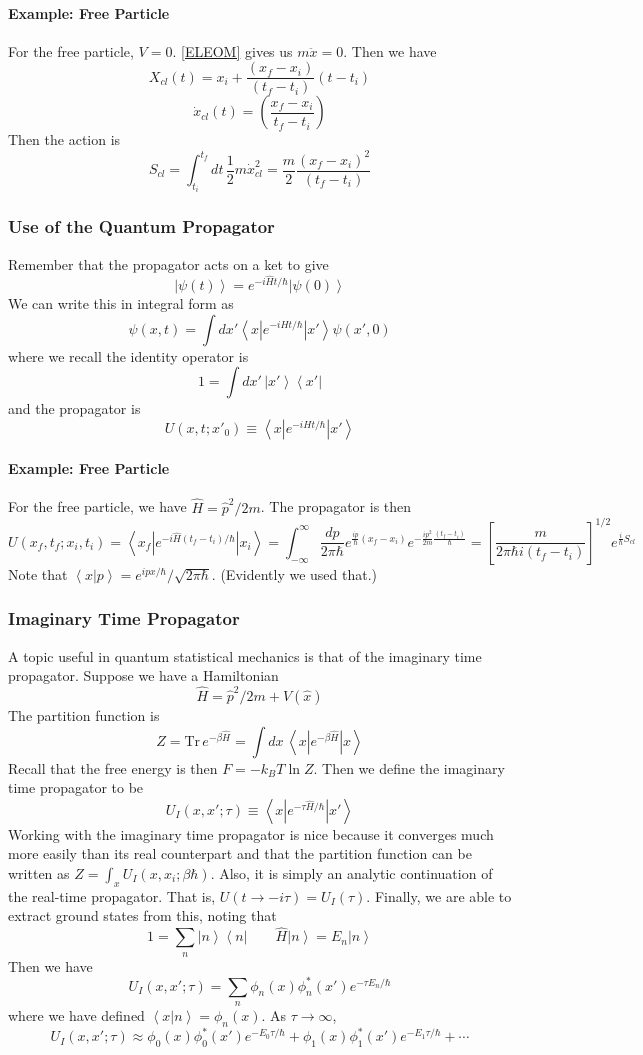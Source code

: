 \documentclass{article}
\begin{document}
	\paragraph{Example: Free Particle} For the free particle, $V=0$. \eqref{ELEOM} gives us $m\ddot{x}=0$. Then we have
	$$X_{cl}(t)=x_i+\frac{(x_f-x_i)}{(t_f-t_i)}(t-t_i)$$
	$$\dot{x}_{cl}(t)=\left(\frac{x_f-x_i}{t_f-t_i}\right)$$
	Then the action is
	$$S_{cl}=\int_{t_i}^{t_f}dt\,\frac{1}{2}m\dot{x}^2_{cl}=\frac{m}{2}\frac{(x_f-x_i)^2}{(t_f-t_i)}$$ 
	\subsubsection{Use of the Quantum Propagator}
	Remember that the propagator acts on a ket to give
	$$\left|\psi(t)\right>=e^{-i\hat{H}t/\hbar}\left|\psi(0)\right>$$
	We can write this in integral form as
	$$\psi(x,t)=\int dx'\left<x\left|e^{-iHt/\hbar}\right|x'\right>\psi(x',0)$$
	where we recall the identity operator is
	$$1=\int dx'\,\left|x'\right>\left<x'\right|$$
	and the propagator is
	$$U(x,t;x'_0)\equiv \left<x\left|e^{-iHt/\hbar}\right|x'\right>$$
	\paragraph{Example: Free Particle} For the free particle, we have $\hat{H}=\hat{p}^2/2m$. The propagator is then
	$$U(x_f,t_f;x_i,t_i)=\left<x_f\left|e^{-i\hat{H}(t_f-t_i)/\hbar}\right|x_i\right>=\int_{-\infty}^\infty \frac{dp}{2\pi\hbar}e^{\frac{ip}{\hbar}(x_f-x_i)}e^{-\frac{ip^2}{2m}\frac{(t_f-t_i)}{\hbar}}=\left[\frac{m}{2\pi\hbar i(t_f-t_i)}\right]^{1/2}e^{\frac{i}{\hbar}S_{cl}}$$
	Note that $\left<x|p\right>=e^{ipx/\hbar}/\sqrt{2\pi\hbar}$. (Evidently we used that.)
	\subsubsection{Imaginary Time Propagator}
	A topic useful in quantum statistical mechanics is that of the imaginary time propagator. Suppose we have a Hamiltonian
	$$\hat{H}=\hat{p}^2/2m+V(\hat{x})$$
	The partition function is 
	$$Z=\mathrm{Tr}\, e^{-\beta\hat{H}}=\int dx\,\left<x\left|e^{-\beta\hat{H}}\right|x\right>$$
	Recall that the free energy is then $F=-k_BT\ln Z$. Then we define the imaginary time propagator to be
	$$U_I(x,x';\tau)\equiv\left<x\left|e^{-\tau \hat{H}/\hbar}\right|x'\right>$$
	Working with the imaginary time propagator is nice because it converges much more easily than its real counterpart and that the partition function can be written as $Z=\int_x U_I(x,x_i;\beta\hbar)$. Also, it is simply an analytic continuation of the real-time propagator. That is, $U(t\to-i\tau)=U_I(\tau)$. Finally, we are able to extract ground states from this, noting that
	$$1=\sum_n\left|n\right>\left<n\right|\qquad \hat{H}\left|n\right>=E_n\left|n\right>$$
	Then we have
	$$U_I(x,x';\tau)=\sum_n \phi_n(x)\phi_n^*(x')e^{-\tau E_n/\hbar}$$
	where we have defined $\left<x|n\right>=\phi_n(x)$. As $\tau\to \infty$,
	$$U_I(x,x';\tau)\approx \phi_0(x)\phi_0^*(x')e^{-E_0\tau/\hbar}+\phi_1(x)\phi_1^*(x')e^{-E_1\tau/\hbar}+\cdots$$
	
\end{document}
